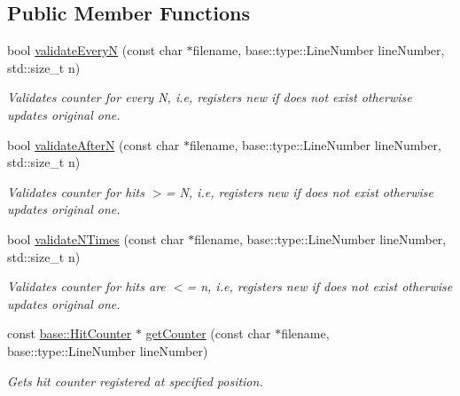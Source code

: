 \subsection*{Public Member Functions}
\begin{DoxyCompactItemize}
\item 
bool \hyperlink{classel_1_1base_1_1RegisteredHitCounters_a586bb8c5e2722e08a255039bb41e03fa}{validate\-Every\-N} (const char $\ast$filename, base\-::type\-::\-Line\-Number line\-Number, std\-::size\-\_\-t n)
\begin{DoxyCompactList}\small\item\em Validates counter for every N, i.\-e, registers new if does not exist otherwise updates original one. \end{DoxyCompactList}\item 
bool \hyperlink{classel_1_1base_1_1RegisteredHitCounters_ad17bfabd59d2142b57282156483708ef}{validate\-After\-N} (const char $\ast$filename, base\-::type\-::\-Line\-Number line\-Number, std\-::size\-\_\-t n)
\begin{DoxyCompactList}\small\item\em Validates counter for hits $>$= N, i.\-e, registers new if does not exist otherwise updates original one. \end{DoxyCompactList}\item 
bool \hyperlink{classel_1_1base_1_1RegisteredHitCounters_acc7e50a6b720a90714e60d2710fdfbe6}{validate\-N\-Times} (const char $\ast$filename, base\-::type\-::\-Line\-Number line\-Number, std\-::size\-\_\-t n)
\begin{DoxyCompactList}\small\item\em Validates counter for hits are $<$= n, i.\-e, registers new if does not exist otherwise updates original one. \end{DoxyCompactList}\item 
\hypertarget{classel_1_1base_1_1RegisteredHitCounters_ae97474e9e70bcbbde91fb6d6c89cc406}{const \hyperlink{classel_1_1base_1_1HitCounter}{base\-::\-Hit\-Counter} $\ast$ \hyperlink{classel_1_1base_1_1RegisteredHitCounters_ae97474e9e70bcbbde91fb6d6c89cc406}{get\-Counter} (const char $\ast$filename, base\-::type\-::\-Line\-Number line\-Number)}\label{classel_1_1base_1_1RegisteredHitCounters_ae97474e9e70bcbbde91fb6d6c89cc406}

\begin{DoxyCompactList}\small\item\em Gets hit counter registered at specified position. \end{DoxyCompactList}\end{DoxyCompactItemize}
